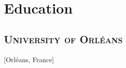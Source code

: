 \documentclass{mycv}
\begin{document}
\maketitle





\vspace{-1em}

\section{Education}

\subsection{\large \scshape University of Orl\'eans}[Orl\'eans, France]

\begin{positions}
\end{positions}

\vspace{-\parskip}
\end{document}
